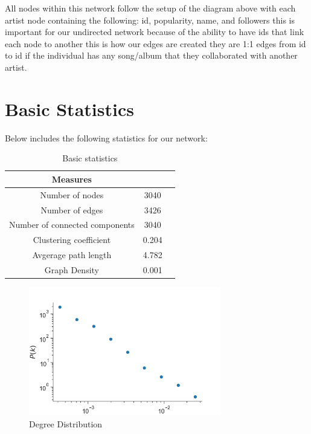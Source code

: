 \documentclass[12pt,a4paper]{article}
\begin{document}
    All nodes within this network follow the setup of the diagram above with each artist node containing the following: id, popularity, name, and followers this is important for our undirected network because of the ability to have ids that link each node to another this is how our edges are created they are 1:1 edges from id to id if the individual has any song/album that they collaborated with another artist.
\section{Basic Statistics}
Below includes the following statistics for our network:
\begin{table}[H]
  \begin{center}
\begin{tabular}{ccc}
  \hline
  Measures &   \\
  \hline
  Number of nodes &  3040\\
  Number of edges & 3426\\
  Number of connected components & 3040\\
  Clustering coefficient & 0.204 \\
  Avgerage path length & 4.782 \\
  Graph Density & 0.001\\
  \hline
  \end{tabular}
\end{center}
  \caption{Basic statistics}\label{tab1}
  \end{table}
  \begin{figure}[H]
    \centering
    \includegraphics[width=0.75\textwidth]{degreedist}
    \caption{Degree Distribution}
\end{figure}
\end{document}
